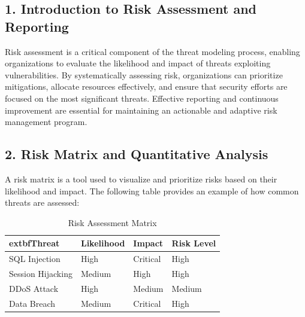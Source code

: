 

\subsection*{1. Introduction to Risk Assessment and Reporting}
Risk assessment is a critical component of the threat modeling process, enabling organizations to evaluate the likelihood and impact of threats exploiting vulnerabilities\cite{uceda2015,nist800154}. By systematically assessing risk, organizations can prioritize mitigations, allocate resources effectively, and ensure that security efforts are focused on the most significant threats. Effective reporting and continuous improvement are essential for maintaining an actionable and adaptive risk management program.

\subsection*{2. Risk Matrix and Quantitative Analysis}
A risk matrix is a tool used to visualize and prioritize risks based on their likelihood and impact\cite{nist800154}. The following table provides an example of how common threats are assessed:
\begin{table}[H]
\centering
\begin{tabular}{|l|l|l|l|}
\hline
		extbf{Threat} & \textbf{Likelihood} & \textbf{Impact} & \textbf{Risk Level} \\
\hline
SQL Injection & High & Critical & High \\
Session Hijacking & Medium & High & High \\
DDoS Attack & High & Medium & Medium \\
Data Breach & Medium & Critical & High \\
\hline
\end{tabular}
\caption{Risk Assessment Matrix\cite{uceda2015,nist800154}}
\end{table}

